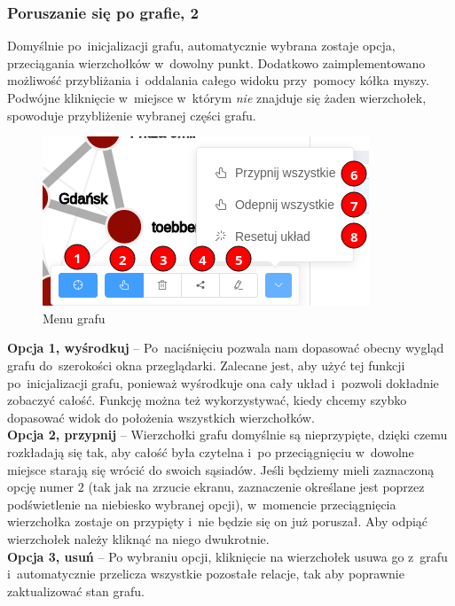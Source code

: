 \documentclass[12pt, a4paper]{article}
\begin{document}
\subsubsection{Poruszanie się po grafie, 2}\label{graph-movement}

Domyślnie po~inicjalizacji grafu, automatycznie wybrana zostaje opcja, przeciągania wierzchołków w~dowolny punkt. Dodatkowo zaimplementowano możliwość przybliżania i~oddalania całego widoku przy~pomocy kółka myszy. Podwójne kliknięcie w~miejsce w~którym \textit{nie} znajduje się żaden wierzchołek, spowoduje przybliżenie wybranej części grafu.

\begin{figure}[H]
  \centering
  \includegraphics[width=0.6\linewidth]{images/graph-menu.png}
  \caption{Menu grafu}
  \label{graph-menu}
\end{figure}

\noindent \textbf{Opcja 1, wyśrodkuj} -- Po~naciśnięciu pozwala nam dopasować obecny wygląd grafu do~szerokości okna przeglądarki. Zalecane jest, aby użyć tej funkcji po~inicjalizacji grafu, ponieważ wyśrodkuje ona cały układ i~pozwoli dokładnie zobaczyć całość. Funkcję można też wykorzystywać, kiedy chcemy szybko dopasować widok do położenia wszystkich wierzchołków.\\

\noindent \textbf{Opcja 2, przypnij} -- Wierzchołki grafu domyślnie są nieprzypięte, dzięki czemu rozkładają się tak, aby całość była czytelna i~po przeciągnięciu w~dowolne miejsce starają się wrócić do swoich sąsiadów. Jeśli będziemy mieli zaznaczoną opcję numer $2$ (tak jak na zrzucie ekranu, zaznaczenie określane jest poprzez podświetlenie na niebiesko wybranej opcji), w~momencie przeciągnięcia wierzchołka zostaje on przypięty i~nie będzie się on już poruszał. Aby odpiąć wierzchołek należy kliknąć na niego dwukrotnie.\\

\noindent \textbf{Opcja 3, usuń} -- Po wybraniu opcji, kliknięcie na wierzchołek usuwa go z~grafu i~automatycznie przelicza wszystkie pozostałe relacje, tak aby poprawnie zaktualizować stan grafu.\\
\end{document}
